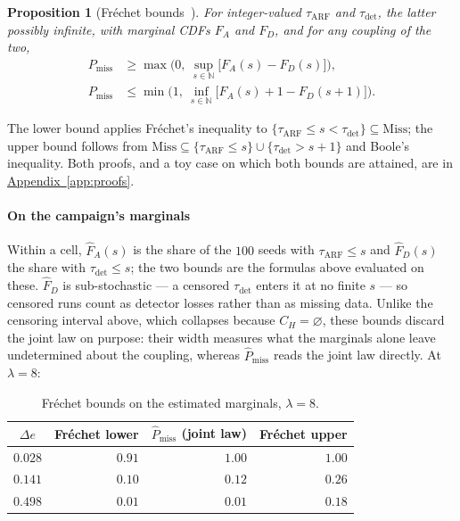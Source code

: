 \documentclass[10pt,conference]{IEEEtran}
\newtheorem{proposition}[theorem]{Proposition}
\theoremstyle{definition}
\begin{document}
\begin{proposition}[Fréchet bounds~\cite{frechet1951}]\label{prop:frechet}
For integer-valued $\tau_{\mathrm{ARF}}$ and $\tau_{\mathrm{det}}$, the latter possibly infinite,
with marginal CDFs $F_A$ and $F_D$, and for any coupling of the two,
\begin{align*}
  P_{\mathrm{miss}} &\ge \max\Big(0,\ \sup_{s\in\mathbb{N}} \big[F_A(s)-F_D(s)\big]\Big),\\
  P_{\mathrm{miss}} &\le \min\Big(1,\ \inf_{s\in\mathbb{N}} \big[F_A(s) + 1 - F_D(s+1)\big]\Big).
\end{align*}
\end{proposition}

\noindent The lower bound applies Fréchet's inequality to
$\{\tau_{\mathrm{ARF}} \le s < \tau_{\mathrm{det}}\} \subseteq \mathrm{Miss}$; the upper bound
follows from $\mathrm{Miss} \subseteq \{\tau_{\mathrm{ARF}} \le s\} \cup
\{\tau_{\mathrm{det}} > s+1\}$ and Boole's inequality. Both proofs, and a toy case on which
both bounds are attained, are in \hyperref[app:proofs]{Appendix~\ref*{app:proofs}}.

\begin{center}
\end{center}

\paragraph{On the campaign's marginals} Within a cell, $\hat F_A(s)$ is the share of the
$100$ seeds with $\tau_{\mathrm{ARF}} \le s$ and $\hat F_D(s)$ the share with
$\tau_{\mathrm{det}} \le s$; the two bounds are the formulas above evaluated on these.
$\hat F_D$ is sub-stochastic --- a censored $\tau_{\mathrm{det}}$ enters it at no finite
$s$ --- so censored runs count as detector losses rather than as missing data. Unlike the censoring
interval above, which collapses because $C_H = \varnothing$, these bounds discard the joint
law on purpose: their width measures what the marginals alone leave undetermined about the
coupling, whereas $\hat P_{\mathrm{miss}}$ reads the joint law directly. At $\lambda = 8$:

\begin{table}[t]
\centering
\caption{Fréchet bounds on the estimated marginals, $\lambda = 8$.}
\begin{tabular}{crrr}
\toprule
$\Delta e$ & Fréchet lower & $\hat P_{\mathrm{miss}}$ (joint law) & Fréchet upper \\
\midrule
$0.028$ & $0.91$ & $1.00$ & $1.00$ \\
$0.141$ & $0.10$ & $0.12$ & $0.26$ \\
$0.498$ & $0.01$ & $0.01$ & $0.18$ \\
\bottomrule
\end{tabular}
\end{table}
\end{document}
